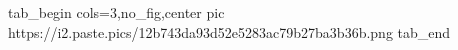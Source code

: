  
 
 
 
 


\ifcmt
  tab_begin cols=3,no_fig,center
     pic https://i2.paste.pics/12b743da93d52e5283ac79b27ba3b36b.png
  tab_end
\fi
